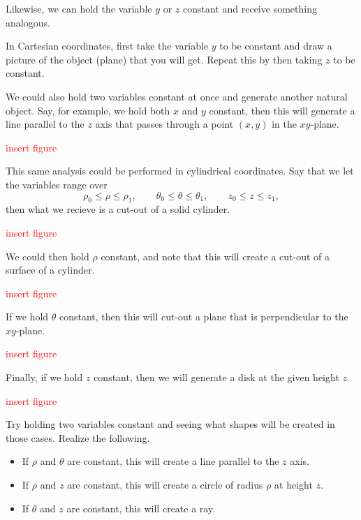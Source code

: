 Likewise, we can hold the variable $y$ or $z$ constant and receive something analogous.

\begin{exercise}
	In Cartesian coordinates, first take the variable $y$ to be constant and draw a picture of the object (plane) that you will get. Repeat this by then taking $z$ to be constant.
\end{exercise}

We could also hold two variables constant at once and generate another natural object.  Say, for example, we hold both $x$ and $y$ constant, then this will generate a line parallel to the $z$ axis that passes through a point $(x,y)$ in the $xy$-plane.

\textcolor{red}{insert figure}

This same analysis could be performed in cylindrical coordinates.  Say that we let the variables range over
\[
\rho_0 \leq \rho \leq \rho_1, \qquad \theta_0 \leq \theta \leq \theta_1, \qquad z_0 \leq z \leq z_1,
\]
then what we recieve is a cut-out of a solid cylinder.

\textcolor{red}{insert figure}

We could then hold $\rho$ constant, and note that this will create a cut-out of a surface of a cylinder.

\textcolor{red}{insert figure}

If we hold $\theta$ constant, then this will cut-out a plane that is perpendicular to the $xy$-plane.

\textcolor{red}{insert figure}

Finally, if we hold $z$ constant, then we will generate a disk at the given height $z$.

\textcolor{red}{insert figure}


\begin{exercise}
	Try holding two variables constant and seeing what shapes will be created in those cases. Realize the following.
	\begin{itemize}
		\item If $\rho$ and $\theta$ are constant, this will create a line parallel to the $z$ axis.
		\item If $\rho$ and $z$ are constant, this will create a circle of radius $\rho$ at height $z$.
		\item If $\theta$ and $z$ are constant, this will create a ray.
	\end{itemize}	
\end{exercise}

